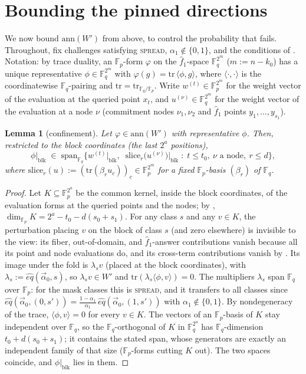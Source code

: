 \documentclass{article}
\newcommand{\Fp}{\mathbb{F}_p}
\newcommand{\Fq}{\mathbb{F}_q}
\newcommand{\extdeg}{d}
\newtheorem{lemma}{Lemma}
\theoremstyle{definition}
\begin{document}
\section{Bounding the pinned directions}\label{sec:pinbound}

We now bound $\mathrm{ann}(W')$ from above, to control the probability that  fails. Throughout, fix challenges satisfying \textsc{spread}, $\alpha_1 \notin \{0, 1\}$, and the conditions of . Notation: by trace duality, an $\Fp$-form $\varphi$ on the $\hat{f}_1$-space $\Fq^{2^m}$ ($m := n - k_0$) has a unique representative $\phi \in \Fq^{2^m}$ with $\varphi(g) = \mathrm{tr}\,\langle \phi, g \rangle$, where $\langle \cdot, \cdot \rangle$ is the coordinatewise $\Fq$-pairing and $\mathrm{tr} = \mathrm{tr}_{\Fq/\Fp}$. Write $w^{(t)} \in \Fp^{2^m}$ for the weight vector of the evaluation at the queried point $x_t$, and $u^{(\nu)} \in \Fq^{2^m}$ for the weight vector of the evaluation at a node $\nu$ (commitment nodes $\nu_1, \nu_2$ and $\hat{f}_1$ points $y_1, \dots, y_{s_1}$).

\begin{lemma}[confinement]\label{lem:confine}
Let $\varphi \in \mathrm{ann}(W')$ with representative $\phi$. Then, restricted to the block coordinates (the last $2^a$ positions),
\[
\phi\big|_{\mathrm{blk}} \;\in\; \mathrm{span}_{\Fq}\Big\{ w^{(t)}\big|_{\mathrm{blk}},\;\; \mathrm{slice}_r\big(u^{(\nu)}\big)\big|_{\mathrm{blk}} \;:\; t \leq t_0,\ \nu \text{ a node},\ r \leq \extdeg \Big\} ,
\]
where $\mathrm{slice}_r(u) := (\mathrm{tr}(\beta_r u_c))_c \in \Fp^{2^m}$ for a fixed $\Fp$-basis $(\beta_r)$ of $\Fq$.
\end{lemma}

\begin{proof}
Let $K \subseteq \Fp^{2^a}$ be the common kernel, inside the block coordinates, of the evaluation forms at the queried points and the nodes; by , $\dim_{\Fp} K = 2^a - t_0 - \extdeg(s_0 + s_1)$. For any class $s$ and any $v \in K$, the perturbation placing $v$ on the block of class $s$ (and zero elsewhere) is invisible to the view: its fiber, out-of-domain, and $\hat{f}_1$-answer contributions vanish because all its point and node evaluations do, and its cross-term contributions vanish by . Its image under the fold is $\lambda_s v$ (placed at the block coordinates), with $\lambda_s := \hat{eq}(\vec{\alpha}_0, s)$, so $\lambda_s v \in W'$ and $\mathrm{tr}(\lambda_s \langle \phi, v \rangle) = 0$. The multipliers $\lambda_s$ span $\Fq$ over $\Fp$: for the mask classes this is \textsc{spread}, and it transfers to all classes since $\hat{eq}(\vec{\alpha}_0, (0, s')) = \frac{1 - \alpha_1}{\alpha_1}\, \hat{eq}(\vec{\alpha}_0, (1, s'))$ with $\alpha_1 \notin \{0, 1\}$. By nondegeneracy of the trace, $\langle \phi, v \rangle = 0$ for every $v \in K$. The vectors of an $\Fp$-basis of $K$ stay independent over $\Fq$, so the $\Fq$-orthogonal of $K$ in $\Fq^{2^a}$ has $\Fq$-dimension $t_0 + \extdeg(s_0 + s_1)$; it contains the stated span, whose generators are exactly an independent family of that size ($\Fp$-forms cutting $K$ out). The two spaces coincide, and $\phi|_{\mathrm{blk}}$ lies in them.
\end{proof}
\end{document}

